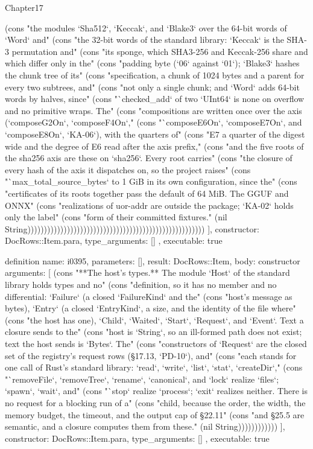 \begin{lexlean}{Chapter17}
\begin{semanticmodule}
{{(cons "the modules `Sha512`, `Keccak`, and `Blake3` over the 64-bit words of `Word` and" (cons "the 32-bit words of the standard library: `Keccak` is the SHA-3 permutation and" (cons "its sponge, which SHA3-256 and Keccak-256 share and which differ only in the" (cons "padding byte (`06` against `01`); `Blake3` hashes the chunk tree of its" (cons "specification, a chunk of 1024 bytes and a parent for every two subtrees, and" (cons "not only a single chunk; and `Word` adds 64-bit words by halves, since" (cons "`checked_add` of two `UInt64` is none on overflow and no primitive wraps. The" (cons "compositions are written once over the axis (`composeG2On`, `composeF4On`," (cons "`composeE6On`, `composeE7On`, and `composeE8On`, `KA-06`), with the quarters of" (cons "E7 a quarter of the digest wide and the degree of E6 read after the axis prefix," (cons "and the five roots of the sha256 axis are these on `sha256`. Every root carries" (cons "the closure of every hash of the axis it dispatches on, so the project raises" (cons "`max_total_source_bytes` to 1 GiB in its own configuration, since the" (cons "certificates of its roots together pass the default of 64 MiB. The GGUF and ONNX" (cons "realizations of uor-addr are outside the package; `KA-02` holds only the label" (cons "form of their committed fixtures." (nil String))))))))))))))))))))))))))))))))))))))))))))))))))))))
    ],
    constructor: DocRows::Item.para,
    type_arguments: []
  },
  executable: true
}

definition{
  name: i0395,
  parameters: [],
  result: DocRows::Item,
  body: constructor{
    arguments: [
      (cons "**The host's types.** The module `Host` of the standard library holds types and no" (cons "definition, so it has no member and no differential: `Failure` (a closed `FailureKind` and the" (cons "host's message as bytes), `Entry` (a closed `EntryKind`, a size, and the identity of the file where" (cons "the host has one), `Child`, `Waited`, `Start`, `Request`, and `Event`. Text a closure sends to the" (cons "host is `String`, so an ill-formed path does not exist; text the host sends is `Bytes`. The" (cons "constructors of `Request` are the closed set of the registry's request rows (§17.13, `PD-10`), and" (cons "each stands for one call of Rust's standard library: `read`, `write`, `list`, `stat`, `createDir`," (cons "`removeFile`, `removeTree`, `rename`, `canonical`, and `lock` realize `files`; `spawn`, `wait`, and" (cons "`stop` realize `process`; `exit` realizes neither. There is no request for a blocking run of a" (cons "child, because the order, the width, the memory budget, the timeout, and the output cap of §22.11" (cons "and §25.5 are semantic, and a closure computes them from these." (nil String))))))))))))
    ],
    constructor: DocRows::Item.para,
    type_arguments: []
  },
  executable: true
}


\end{semanticmodule}
\end{lexlean}
